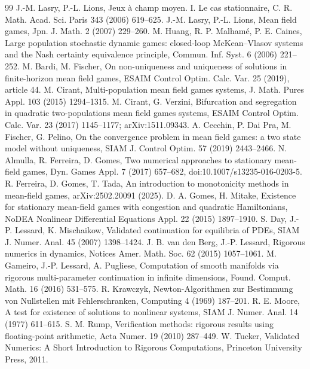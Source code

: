 \documentclass[11pt]{article}
\theoremstyle{definition}
\begin{document}
\begin{thebibliography}{99}\footnotesize\setlength{\itemsep}{0pt}
 J.-M. Lasry, P.-L. Lions, Jeux \`a champ moyen. I. Le cas stationnaire, C. R. Math. Acad. Sci. Paris 343 (2006) 619--625.
 J.-M. Lasry, P.-L. Lions, Mean field games, Jpn. J. Math. 2 (2007) 229--260.
 M. Huang, R. P. Malham\'e, P. E. Caines, Large population stochastic dynamic games: closed-loop McKean--Vlasov systems and the Nash certainty equivalence principle, Commun. Inf. Syst. 6 (2006) 221--252.
 M. Bardi, M. Fischer, On non-uniqueness and uniqueness of solutions in finite-horizon mean field games, ESAIM Control Optim. Calc. Var. 25 (2019), article 44.
 M. Cirant, Multi-population mean field games systems, J. Math. Pures Appl. 103 (2015) 1294--1315.
 M. Cirant, G. Verzini, Bifurcation and segregation in quadratic two-populations mean field games systems, ESAIM Control Optim. Calc. Var. 23 (2017) 1145--1177; arXiv:1511.09343.
 A. Cecchin, P. Dai Pra, M. Fischer, G. Pelino, On the convergence problem in mean field games: a two state model without uniqueness, SIAM J. Control Optim. 57 (2019) 2443--2466.
 N. Almulla, R. Ferreira, D. Gomes, Two numerical approaches to stationary mean-field games, Dyn. Games Appl. 7 (2017) 657--682, doi:10.1007/s13235-016-0203-5.
 R. Ferreira, D. Gomes, T. Tada, An introduction to monotonicity methods in mean-field games, arXiv:2502.20091 (2025).
 D. A. Gomes, H. Mitake, Existence for stationary mean-field games with congestion and quadratic Hamiltonians, NoDEA Nonlinear Differential Equations Appl. 22 (2015) 1897--1910.
 S. Day, J.-P. Lessard, K. Mischaikow, Validated continuation for equilibria of PDEs, SIAM J. Numer. Anal. 45 (2007) 1398--1424.
 J. B. van den Berg, J.-P. Lessard, Rigorous numerics in dynamics, Notices Amer. Math. Soc. 62 (2015) 1057--1061.
 M. Gameiro, J.-P. Lessard, A. Pugliese, Computation of smooth manifolds via rigorous multi-parameter continuation in infinite dimensions, Found. Comput. Math. 16 (2016) 531--575.
 R. Krawczyk, Newton-Algorithmen zur Bestimmung von Nullstellen mit Fehlerschranken, Computing 4 (1969) 187--201.
 R. E. Moore, A test for existence of solutions to nonlinear systems, SIAM J. Numer. Anal. 14 (1977) 611--615.
 S. M. Rump, Verification methods: rigorous results using floating-point arithmetic, Acta Numer. 19 (2010) 287--449.
 W. Tucker, Validated Numerics: A Short Introduction to Rigorous Computations, Princeton University Press, 2011.

\end{thebibliography}
\end{document}
